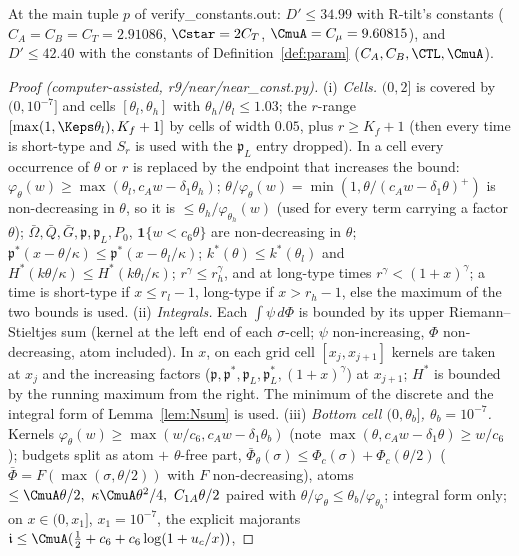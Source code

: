 \begin{lemma}[E: evaluation]\label{lem:Ne}
At the main tuple $p$ of verify\_constants.out: $D'\le34.99$ with R-tilt's constants ($C_A=C_B=C_T=2.91086$, $\Cstar=2C_T$,
$\CmuA=C_\mu=9.60815$), and $D'\le42.40$ with the constants of Definition~\ref{def:param} ($C_A,C_B,\CTL,\CmuA$).
\end{lemma}
\begin{proof}[Proof (computer-assisted, r9/near/near\_const.py)]
(i) \emph{Cells.} $(0,2]$ is covered by $(0,10^{-7}]$ and cells $[\theta_l,\theta_h]$ with $\theta_h/\theta_l\le1.03$; the $r$-range
$[\max(1,\Keps\theta_l),K_f+1]$ by cells of width $0.05$, plus $r\ge K_f+1$ (then every time is short-type and $S_r$ is used with the
$\mathfrak p_L$ entry dropped). In a cell every occurrence of $\theta$ or $r$ is replaced by the endpoint that increases the bound:
$\varphi_\theta(w)\ge\max(\theta_l,c_Aw-\delta_1\theta_h)$; $\theta/\varphi_\theta(w)=\min(1,\theta/(c_Aw-\delta_1\theta)^+)$ is
non-decreasing in $\theta$, so it is $\le\theta_h/\varphi_{\theta_h}(w)$ (used for every term carrying a factor $\theta$);
$\bar\Omega,\bar Q,\bar G,\mathfrak p,\mathfrak p_L,P_0$, $\mathbf 1\{w<c_6\theta\}$ are non-decreasing in $\theta$; $\mathfrak p^*(x-\theta/\kappa)
\le\mathfrak p^*(x-\theta_l/\kappa)$; $k^*(\theta)\le k^*(\theta_l)$ and $H^*(k\theta/\kappa)\le H^*(k\theta_l/\kappa)$; $r^\gamma\le r_h^\gamma$,
and at long-type times $r^\gamma<(1+x)^\gamma$; a time is short-type if $x\le r_l-1$, long-type if $x>r_h-1$, else the maximum of
the two bounds is used. (ii) \emph{Integrals.} Each $\int\psi\,d\Phi$ is bounded by its upper Riemann--Stieltjes sum (kernel at the left
end of each $\sigma$-cell; $\psi$ non-increasing, $\Phi$ non-decreasing, atom included). In $x$, on each grid cell $[x_j,x_{j+1}]$
kernels are taken at $x_j$ and the increasing factors ($\mathfrak p,\mathfrak p^*,\mathfrak p_L,\mathfrak p_L^*,(1+x)^\gamma$) at $x_{j+1}$;
$H^*$ is bounded by the running maximum from the right. The minimum of the discrete and the integral form of
Lemma~\ref{lem:Nsum} is used. (iii) \emph{Bottom cell $(0,\theta_b]$, $\theta_b=10^{-7}$.} Kernels $\varphi_\theta(w)\ge
\max(w/c_6,c_Aw-\delta_1\theta_b)$ (note $\max(\theta,c_Aw-\delta_1\theta)\ge w/c_6$); budgets split as atom $+$ $\theta$-free part,
$\bar\Phi_\theta(\sigma)\le\Phi_c(\sigma)+\Phi_c(\theta/2)$ ($\bar\Phi=F(\max(\sigma,\theta/2))$ with $F$ non-decreasing), atoms
$\le\CmuA\theta/2,\ \kappa\CmuA\theta^2/4,\ C_{1A}\theta/2$ paired with $\theta/\varphi_\theta\le\theta_b/\varphi_{\theta_b}$; integral
form only; on $x\in(0,x_1]$, $x_1=10^{-7}$, the explicit majorants $\mathfrak i\le\CmuA(\frac12+c_6+c_6\log(1+u_c/x))$,

\end{proof}
